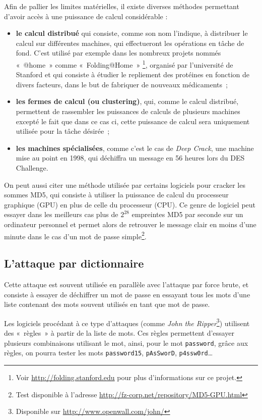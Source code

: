 Afin de pallier les limites matérielles, il existe diverses
méthodes permettant d'avoir accès à une puissance de
calcul considérable :
\begin{itemize}
  \item {\sffamily\textbf{le calcul distribué}} qui consiste, comme son nom
l'indique,
à distribuer le calcul sur différentes machines, qui effectueront
les opérations en tâche de fond. C'est utilisé par exemple dans
les nombreux projets nommés «~@home~» comme «~Folding@Home~»
\footnote{Voir \url{http://folding.stanford.edu} pour plus
d'informations sur ce projet.},
organisé par l'université de Stanford et qui consiste à étudier
le repliement des protéines en fonction de divers facteurs, dans
le but de fabriquer de nouveaux médicaments~;
  \item {\sffamily\textbf{les fermes de calcul (ou clustering)}}, qui, comme le
calcul distribué, permettent de rassembler les puissances de
calculs de plusieurs machines excepté le fait que dans ce cas ci, cette
puissance de calcul sera uniquement utilisée pour la tâche
désirée~;
  \item {\sffamily\textbf{les machines spécialisées}}, comme c'est le cas de
\emph{Deep Crack}, une machine mise au point en 1998, qui déchiffra
un message en 56 heures lors du DES Challenge.\\
\end{itemize}

On peut aussi citer une méthode utilisée par certains logiciels pour
cracker les sommes MD5, qui consiste à utiliser la
puissance de calcul du processeur graphique (GPU) en plus de celle
du processeur (CPU). Ce genre de logiciel peut essayer dans les
meilleurs cas plus de
$2^{28}$ empreintes MD5 par seconde sur un ordinateur 
personnel et permet alors de retrouver le message clair en
moins d'une minute dans le cas d'un mot de passe simple\footnote{Test disponible à l'adresse
\url{http://fz-corp.net/repository/MD5-GPU.html}}.

\subsection{L'attaque par dictionnaire}
Cette attaque est souvent utilisée en parallèle avec l'attaque par
force brute, et consiste à essayer de déchiffrer un mot de passe
en essayant tous les mots d'une liste contenant des mots souvent
utilisés en tant que mot de passe.

Les logiciels procédant à ce type d'attaques (comme \emph{John the
Ripper}\footnote{Disponible sur
\url{http://www.openwall.com/john/}}) utilisent des «~règles~» à
partir de la liste de mots. Ces règles permettent d'essayer
plusieurs combinaisons utilisant le mot, ainsi, pour le mot
\texttt{password}, grâce aux règles, on pourra tester les mots
\texttt{password15}, \texttt{pAsSworD}, \texttt{p4ssw0rd}\dots

